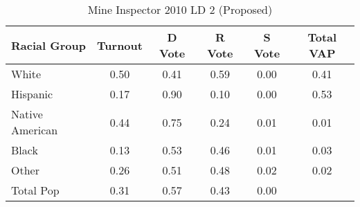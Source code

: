 \begin{table}[htb]
\begin{center}
\caption{Mine Inspector 2010 LD 2 (Proposed)}
\label{smine_vap_ld_2}
\begin{tabular}{lccccc}
  \hline
Racial Group & Turnout & D Vote & R Vote & S Vote & Total VAP \\ 
  \hline
White & 0.50 & 0.41 & 0.59 & 0.00 & 0.41 \\ 
  Hispanic & 0.17 & 0.90 & 0.10 & 0.00 & 0.53 \\ 
  Native American & 0.44 & 0.75 & 0.24 & 0.01 & 0.01 \\ 
  Black & 0.13 & 0.53 & 0.46 & 0.01 & 0.03 \\ 
  Other & 0.26 & 0.51 & 0.48 & 0.02 & 0.02 \\ 
  Total Pop & 0.31 & 0.57 & 0.43 & 0.00 &  \\ 
   \hline
\end{tabular}
\end{center}
\end{table}
